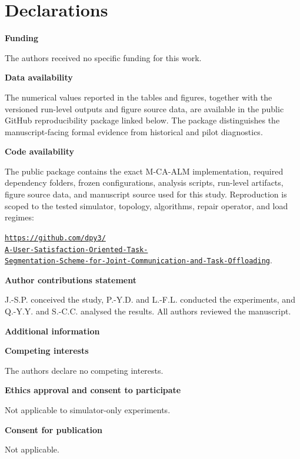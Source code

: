\documentclass[pdflatex,sn-mathphys-num]{sn-jnl}
\newcommand{\GitHubURL}{%
  \href{https://github.com/dpy3/A-User-Satisfaction-Oriented-Task-Segmentation-Scheme-for-Joint-Communication-and-Task-Offloading/tree/main/Cluster_Computing_Reproducibility_2026-10-15}{\texttt{https://github.com/dpy3/}}\\[-0.15em]
  \href{https://github.com/dpy3/A-User-Satisfaction-Oriented-Task-Segmentation-Scheme-for-Joint-Communication-and-Task-Offloading/tree/main/Cluster_Computing_Reproducibility_2026-10-15}{\texttt{A-User-Satisfaction-Oriented-Task-}}\\[-0.15em]
  \href{https://github.com/dpy3/A-User-Satisfaction-Oriented-Task-Segmentation-Scheme-for-Joint-Communication-and-Task-Offloading/tree/main/Cluster_Computing_Reproducibility_2026-10-15}{\texttt{Segmentation-Scheme-for-Joint-Communication-and-Task-Offloading}}}
\begin{document}

\backmatter
\section*{Declarations}
\noindent\textbf{Funding}\par
The authors received no specific funding for this work.
\par\medskip

\noindent\textbf{Data availability}\par
The numerical values reported in the tables and figures, together with the
versioned run-level outputs and figure source data, are available in the public
GitHub reproducibility package linked below. The package distinguishes the
manuscript-facing formal evidence from historical and pilot diagnostics.\par\medskip

\noindent\textbf{Code availability}\par
The public package contains the exact M-CA-ALM implementation, required
dependency folders, frozen configurations, analysis scripts, run-level
artifacts, figure source data, and manuscript source used for this study.
Reproduction is scoped to the tested simulator, topology, algorithms, repair
operator, and load regimes:\par
\GitHubURL.\par\medskip

\noindent\textbf{Author contributions statement}\par
J.-S.P. conceived the study, P.-Y.D. and L.-F.L. conducted the experiments, and Q.-Y.Y. and S.-C.C. analysed the results. All authors reviewed the manuscript.
\par\medskip

\noindent\textbf{Additional information}\par
\noindent\textbf{Competing interests}\par
The authors declare no competing interests.
\par\medskip

\noindent\textbf{Ethics approval and consent to participate}\par
Not applicable to simulator-only experiments.
\par\medskip

\noindent\textbf{Consent for publication}\par
Not applicable.


\end{document}
